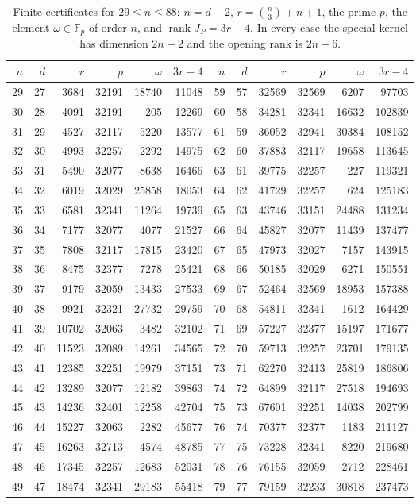 \documentclass{amsart}
\theoremstyle{definition}
\theoremstyle{remark}
\numberwithin{equation}{section}
\DeclareMathOperator{\rank}{rank}
\begin{document}
\begin{table}[tp]\small\setlength{\tabcolsep}{4pt}
\caption{Finite certificates for $29\le n\le88$: $n=d+2$, $r=\binom n3+n+1$, the prime $p$, the element $\omega\in\mathbb F_p$ of order $n$, and $\rank J_P=3r-4$. In every case the special kernel has dimension $2n-2$ and the opening rank is $2n-6$.}\label{tab:finite}
\begin{tabular}{rrrrrr@{\qquad}rrrrrr}\toprule
$n$&$d$&$r$&$p$&$\omega$&$3r-4$&$n$&$d$&$r$&$p$&$\omega$&$3r-4$\\\midrule
29&27&3684&32191&18740&11048&59&57&32569&32569&6207&97703\\
30&28&4091&32191&205&12269&60&58&34281&32341&16632&102839\\
31&29&4527&32117&5220&13577&61&59&36052&32941&30384&108152\\
32&30&4993&32257&2292&14975&62&60&37883&32117&19658&113645\\
33&31&5490&32077&8638&16466&63&61&39775&32257&227&119321\\
34&32&6019&32029&25858&18053&64&62&41729&32257&624&125183\\
35&33&6581&32341&11264&19739&65&63&43746&33151&24488&131234\\
36&34&7177&32077&4077&21527&66&64&45827&32077&11439&137477\\
37&35&7808&32117&17815&23420&67&65&47973&32027&7157&143915\\
38&36&8475&32377&7278&25421&68&66&50185&32029&6271&150551\\
39&37&9179&32059&13433&27533&69&67&52464&32569&18953&157388\\
40&38&9921&32321&27732&29759&70&68&54811&32341&1612&164429\\
41&39&10702&32063&3482&32102&71&69&57227&32377&15197&171677\\
42&40&11523&32089&14261&34565&72&70&59713&32257&23701&179135\\
43&41&12385&32251&19979&37151&73&71&62270&32413&25819&186806\\
44&42&13289&32077&12182&39863&74&72&64899&32117&27518&194693\\
45&43&14236&32401&12258&42704&75&73&67601&32251&14038&202799\\
46&44&15227&32063&2282&45677&76&74&70377&32377&1183&211127\\
47&45&16263&32713&4574&48785&77&75&73228&32341&8220&219680\\
48&46&17345&32257&12683&52031&78&76&76155&32059&2712&228461\\
49&47&18474&32341&29183&55418&79&77&79159&32233&30818&237473\\

\end{tabular}
\end{table}
\end{document}

